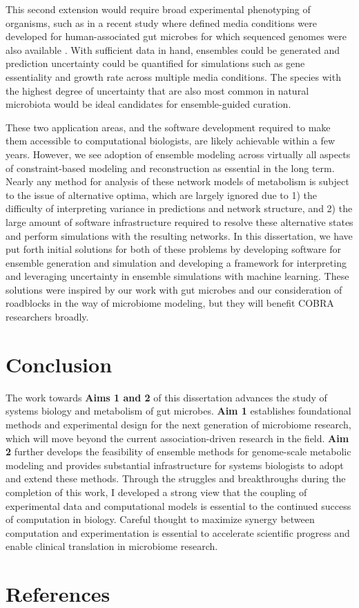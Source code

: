 \documentclass[11pt,twocolumn,notitlepage,openany,twoside]{book}
\begin{document}
\begin{refsection}
This second extension would require broad experimental phenotyping of organisms, such as in a recent study where defined media conditions were developed for human-associated gut microbes for which sequenced genomes were also available \cite{Tramontano2018-xz}. With sufficient data in hand, ensembles could be generated and prediction uncertainty could be quantified for simulations such as gene essentiality and growth rate across multiple media conditions. The species with the highest degree of uncertainty that are also most common in natural microbiota would be ideal candidates for ensemble-guided curation.

These two application areas, and the software development required to make them accessible to computational biologists, are likely achievable within a few years. However, we see adoption of ensemble modeling across virtually all aspects of constraint-based modeling and reconstruction as essential in the long term. Nearly any method for analysis of these network models of metabolism is subject to the issue of alternative optima, which are largely ignored due to 1) the difficulty of interpreting variance in predictions and network structure, and 2) the large amount of software infrastructure required to resolve these alternative states and perform simulations with the resulting networks. In this dissertation, we have put forth initial solutions for both of these problems by developing software for ensemble generation and simulation and developing a framework for interpreting and leveraging uncertainty in ensemble simulations with machine learning. These solutions were inspired by our work with gut microbes and our consideration of roadblocks in the way of microbiome modeling, but they will benefit COBRA researchers broadly.

\section{Conclusion}

The work towards \textbf{Aims 1 and 2} of this dissertation advances the study of systems biology and metabolism of gut microbes. \textbf{Aim 1} establishes foundational methods and experimental design for the next generation of microbiome research, which will move beyond the current association-driven research in the field. \textbf{Aim 2} further develops the feasibility of ensemble methods for genome-scale metabolic modeling and provides substantial infrastructure for systems biologists to adopt and extend these methods. Through the struggles and breakthroughs during the completion of this work, I developed a strong view that the coupling of experimental data and computational models is essential to the continued success of computation in biology. Careful thought to maximize synergy between computation and experimentation is essential to accelerate scientific progress and enable clinical translation in microbiome research.

\section{References}

\printbibliography[heading=none]
\end{refsection}
\end{document}
